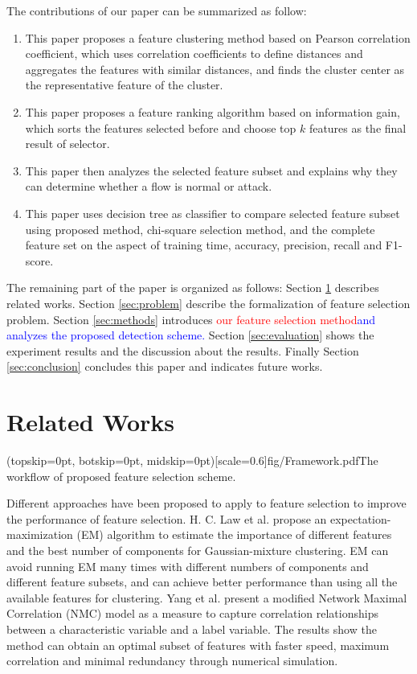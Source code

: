 \documentclass{ieeeaccess}
\theoremstyle{definition}
\newcommand{\change}[2]{\textcolor{red}{#1}\textcolor{blue}{#2}}
\begin{document}
The contributions of our paper can be summarized as follow:

\begin{enumerate}
    \item This paper proposes a feature clustering method based on Pearson correlation coefficient, which uses correlation coefficients to define distances and aggregates the features with similar distances, and finds the cluster center as the representative feature of the cluster.
    \item This paper proposes a feature ranking algorithm based on information gain, which sorts the features selected before and choose top $k$ features as the final result of selector.
    \item This paper then analyzes the selected feature subset and explains why they can determine whether a flow is normal or attack.
    \item This paper uses decision tree as classifier to compare selected feature subset using proposed method, chi-square selection method, and the complete feature set on the aspect of training time, accuracy, precision, recall and F1-score.
\end{enumerate}

The remaining part of the paper is organized as follows: Section \ref{sec:related} describes related works. Section \ref{sec:problem} describe the formalization of feature selection problem. Section \ref{sec:methods} introduces \change{our feature selection method}{and analyzes the proposed detection scheme.} Section \ref{sec:evaluation} shows the experiment results and the discussion about the results. Finally Section \ref{sec:conclusion} concludes this paper and indicates future works.

\section{Related Works}
\label{sec:related}

\Figure[!htpb](topskip=0pt, botskip=0pt, midskip=0pt)[scale=0.6]{fig/Framework.pdf}{The workflow of proposed feature selection scheme.\label{fig:framework}}

Different approaches have been proposed to apply to feature selection to improve the performance of feature selection. H. C. Law et al. propose an expectation-maximization (EM) algorithm to estimate the importance of different features and the best number of components for Gaussian-mixture clustering\cite{Law2004}. EM can avoid running EM many times with different numbers of components and different feature subsets, and can achieve better performance than using all the available features for clustering. Yang et al.\cite{Yang2018} present a modified Network Maximal Correlation (NMC) model as a measure to capture correlation relationships between a characteristic variable and a label variable. The results show the method can obtain an optimal subset of features with faster speed, maximum correlation and minimal redundancy through numerical simulation.
\end{document}
